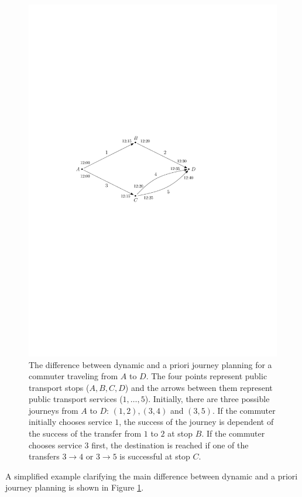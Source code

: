 \documentclass[dissertation,draft*]{aaltoseries}
\begin{document}
\begin{figure}[ht]
\begin{center}
\includegraphics[width=0.9\columnwidth]{stokvsdet01}
\end{center}
\caption{The difference between dynamic and a priori journey planning for a commuter 
traveling from $A$ to $D$. The four points represent public transport stops ($A,B,C,D$) and 
the arrows between them represent public transport services ($1,\ldots,5$).
Initially, there are three possible journeys from $A$ to $D$: $(1,2),(3,4)$ and $(3,5)$.
If the commuter initially chooses service $1$, the success of the journey is 
dependent of the success of the transfer from $1$ to $2$ at stop $B$. If the commuter chooses
service $3$ first, the destination is reached if one of the transfers $3 \to 4$ or $3 \to 5$
is successful at stop $C$.
}
\label{stokvsdet01}
\end{figure}

A simplified example clarifying the main difference between dynamic and a priori journey planning is 
shown in Figure \ref{stokvsdet01}. 
\end{document}
